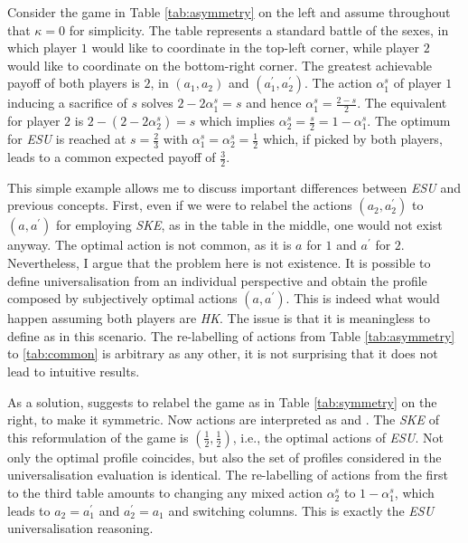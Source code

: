\vspace*{0.4cm}

Consider the game in Table \ref{tab:asymmetry} on the left and assume throughout that \( \kappa = 0 \) for simplicity. The table represents a standard battle of the sexes, in which player \( 1 \) would like to coordinate in the top-left corner, while player \( 2 \) would like to coordinate on the bottom-right corner. The greatest achievable payoff of both players is \(2\), in \((a_1, a_2)\) and \((a_1^{\prime}, a_2^{\prime} )\). The action \(\alpha_1^{s}\) of player \(1\) inducing a sacrifice of \(s\) solves \(2 - 2 \alpha_1^{s} = s\) and hence \(\alpha_1^{s} = \frac{2 - s}{2}\). The equivalent for player \(2\) is \(2 - (2 -  2 \alpha_2^{s}) = s\) which implies \(\alpha_2^{s} = \frac{s}{2} = 1 - \alpha_1^{s}\). The optimum for \textit{ESU} is reached at \(s= \frac{2}{3}\) with \(\alpha_1^{s} = \alpha_2^{s} = \frac{1}{2}\) which, if picked by both players, leads to a common expected payoff of \(\frac{3}{2}\).

This simple example allows me to discuss important differences between \textit{ESU} and previous concepts. First, even if we were to relabel the actions \(( a_2, a_2^{\prime})\) to \((a, a^{\prime} )\) for employing \textit{SKE}, as in the table in the middle, one would not exist anyway. The optimal action is not common, as it is \(a\) for \(1\) and \(a^{\prime}\) for \(2\). Nevertheless, I argue that the problem here is not existence. It is possible to define universalisation from an individual perspective and obtain the profile composed by subjectively optimal actions \(( a, a^{\prime} )\). This is indeed what would happen assuming both players are \textit{HK}. The issue is that it is meaningless to define  as  in this scenario. The re-labelling of actions from Table \ref{tab:asymmetry} to \ref{tab:common} is arbitrary as any other, it is not surprising that it does not lead to intuitive results.

As a solution, \citet[p. 26]{roemer2019cooperate} suggests to relabel the game as in Table \ref{tab:symmetry} on the right, to make it symmetric. Now actions are interpreted as  and . The \textit{SKE} of this reformulation of the game is \(( \frac{1}{2}, \frac{1}{2} )\), i.e., the optimal actions of \textit{ESU}. Not only the optimal profile coincides, but also the set of profiles considered in the universalisation evaluation is identical. The re-labelling of actions from the first to the third table amounts to changing any mixed action \(\alpha_2^{s}\) to \(1 - \alpha_1^{s}\), which leads to \(a_2=a_1^{\prime}\) and \(a_2^{\prime}=a_1\) and switching columns. This is exactly the \textit{ESU} universalisation reasoning.

